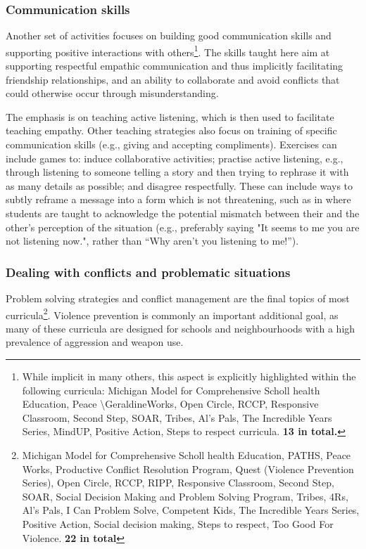 \documentclass[prodmode,acmtochi]{acmsmall}
\begin{document}
\subsubsection{Communication skills}%
                Another set of activities focuses on building good communication skills and supporting positive interactions with others\footnote{While implicit in many others, this aspect is explicitly highlighted within the following curricula: Michigan Model for Comprehensive Scholl health Education, Peace \textbackslash GeraldineWorks, Open Circle, RCCP, Responsive Classroom, Second Step, SOAR, Tribes, Al's Pals, The Incredible Years Series, MindUP, Positive Action, Steps to respect curricula. {\bf 13 in total.}}. The skills taught here aim at supporting respectful empathic communication and thus implicitly facilitating friendship relationships, and an ability to collaborate and avoid conflicts that could otherwise occur through misunderstanding. 

                 The emphasis is on teaching active listening, which is then used to facilitate teaching empathy. Other teaching strategies also focus on training of specific communication skills (e.g., giving and accepting compliments).
                Exercises can include games to: induce collaborative activities; practise active listening, e.g., through listening to someone telling a story and then trying to rephrase it with as many details as possible; and disagree respectfully. These can include ways to subtly reframe a message into a form which is not threatening, such as in  where students are taught to acknowledge the potential mismatch between their and the other's perception of the situation (e.g., preferably saying "It seems to me you are not listening now.", rather than ``Why aren't you listening to me!'').

        \subsubsection{Dealing with conflicts and problematic situations} 
                Problem solving strategies and conflict management are the final topics of most curricula\footnote{Michigan Model for Comprehensive Scholl health Education, PATHS, Peace Works, Productive Conflict Resolution Program, Quest (Violence Prevention Series), Open Circle, RCCP, RIPP, Responsive Classroom, Second Step, SOAR, Social Decision Making and Problem Solving Program, Tribes, 4Rs, Al's Pals, I Can Problem Solve, Competent Kids, The Incredible Years Series, Positive Action, Social decision making, Steps to respect, Too Good For Violence. {\bf 22 in total}}.  Violence prevention is commonly an important additional goal, as many of these curricula are designed  for schools and neighbourhoods with a high prevalence of aggression and weapon use. 
                
\end{document}
